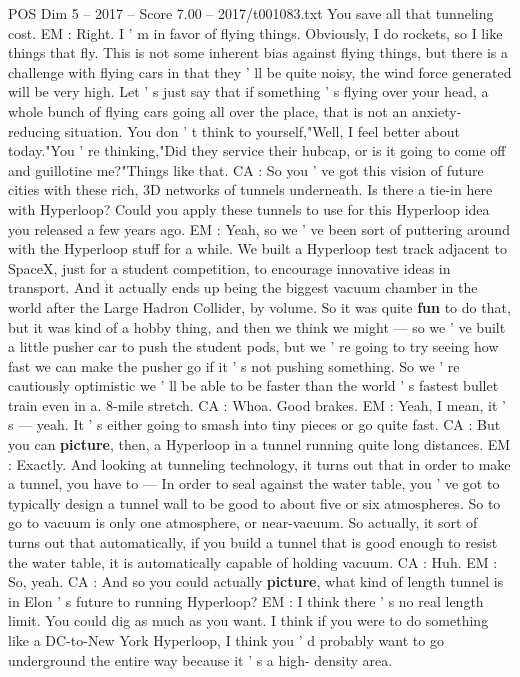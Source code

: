\begin{textsample}{POS Dim 5 – 2017 – Score 7.00 – 2017/t001083.txt}
You save all that tunneling cost.
EM : Right.
I ' m in favor of flying things.
Obviously, I do rockets, so I like things that fly.
This is not some inherent bias against flying things, but there is a challenge with flying cars in that they ' ll be quite noisy, the wind force generated will be very high.
Let ' s just say that if something ' s flying over your head, a whole bunch of flying cars going all over the place, that is not an anxiety-reducing situation.
You don ' t think to yourself,"Well, I feel better about today."You ' re thinking,"Did they service their hubcap, or is it going to come off and guillotine me?"Things like that.
CA : So you ' ve got this vision of future cities with these rich, 3D networks of tunnels underneath.
Is there a tie-in here with Hyperloop?
Could you apply these tunnels to use for this Hyperloop idea you released a few years ago.
EM : Yeah, so we ' ve been sort of puttering around with the Hyperloop stuff for a while.
We built a Hyperloop test track adjacent to SpaceX, just for a student competition, to encourage innovative ideas in transport.
And it actually ends up being the biggest vacuum chamber in the world after the Large Hadron Collider, by volume.
So it was quite \textbf{fun} to do that, but it was kind of a hobby thing, and then we think we might — so we ' ve built a little pusher car to push the student pods, but we ' re going to try seeing how fast we can make the pusher go if it ' s not pushing something.
So we ' re cautiously optimistic we ' ll be able to be faster than the world ' s fastest bullet train even in a. 8-mile stretch.
CA : Whoa.
Good brakes.
EM : Yeah, I mean, it ' s — yeah.
It ' s either going to smash into tiny pieces or go quite fast.
CA : But you can \textbf{picture}, then, a Hyperloop in a tunnel running quite long distances.
EM : Exactly.
And looking at tunneling technology, it turns out that in order to make a tunnel, you have to — In order to seal against the water table, you ' ve got to typically design a tunnel wall to be good to about five or six atmospheres.
So to go to vacuum is only one atmosphere, or near-vacuum.
So actually, it sort of turns out that automatically, if you build a tunnel that is good enough to resist the water table, it is automatically capable of holding vacuum.
CA : Huh.
EM : So, yeah.
CA : And so you could actually \textbf{picture}, what kind of length tunnel is in Elon ' s future to running Hyperloop?
EM : I think there ' s no real length limit.
You could dig as much as you want.
I think if you were to do something like a DC-to-New York Hyperloop, I think you ' d probably want to go underground the entire way because it ' s a high- density area.

\end{textsample}
